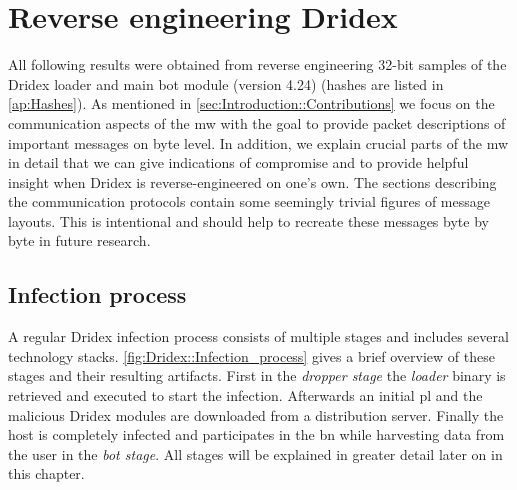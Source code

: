 \chapter{Reverse engineering Dridex\label{ch:Reverse_engineering_Dridex}}


All following results were obtained from reverse engineering 32-bit samples of the Dridex loader and main bot module (version 4.24) (hashes are listed in \autoref{ap:Hashes}).
As mentioned in \autoref{sec:Introduction::Contributions} we focus on the communication aspects of the \gls{mw} with the goal to provide packet descriptions of important messages on byte level.
In addition, we explain crucial parts of the \gls{mw} in detail that we can give indications of compromise and to provide helpful insight when Dridex is reverse-engineered on one's own.
The sections describing the communication protocols contain some seemingly trivial figures of message layouts.
This is intentional and should help to recreate these messages byte by byte in future research.

\section{Infection process\label{sec:Reverse_engineering_Dridex::Infection process}}
A regular Dridex infection process consists of multiple stages and includes several technology stacks.
\autoref{fig:Dridex::Infection_process} gives a brief overview of these stages and their resulting artifacts.
First in the \emph{dropper stage} the \emph{loader} binary is retrieved and executed to start the infection.
Afterwards an initial \gls{pl} and the malicious Dridex modules are downloaded from a distribution server.
Finally the host is completely infected and participates in the \gls{bn} while harvesting data from the user in the \emph{bot stage}.
All stages will be explained in greater detail later on in this chapter.

